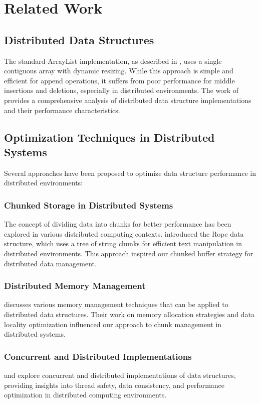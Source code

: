\section{Related Work}
\label{sec:related-work}

\subsection{Distributed Data Structures}

The standard ArrayList implementation, as described in \cite{java-collections}, uses a single contiguous array with dynamic resizing. While this approach is simple and efficient for append operations, it suffers from poor performance for middle insertions and deletions, especially in distributed environments. The work of \cite{data-structures} provides a comprehensive analysis of distributed data structure implementations and their performance characteristics.

\subsection{Optimization Techniques in Distributed Systems}

Several approaches have been proposed to optimize data structure performance in distributed environments:

\subsubsection{Chunked Storage in Distributed Systems}
The concept of dividing data into chunks for better performance has been explored in various distributed computing contexts. \cite{rope-data-structure} introduced the Rope data structure, which uses a tree of string chunks for efficient text manipulation in distributed environments. This approach inspired our chunked buffer strategy for distributed data management.

\subsubsection{Distributed Memory Management}
\cite{memory-management} discusses various memory management techniques that can be applied to distributed data structures. Their work on memory allocation strategies and data locality optimization influenced our approach to chunk management in distributed systems.

\subsubsection{Concurrent and Distributed Implementations}
\cite{concurrent-collections} and \cite{performance-optimization} explore concurrent and distributed implementations of data structures, providing insights into thread safety, data consistency, and performance optimization in distributed computing environments.

